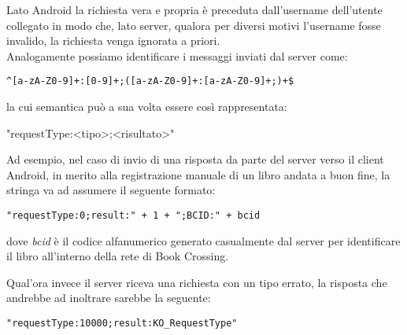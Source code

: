 \noindent Lato Android la richiesta vera e propria è preceduta dall'username dell'utente collegato in modo che, lato server, qualora per diversi motivi l'username fosse invalido, la richiesta venga ignorata a priori.
\\ \noindent
Analogamente possiamo identificare i messaggi inviati dal server come:
\begin{lstlisting}[caption={\textit{RegEx} utilizzata lato server per l'interpretazione delle richieste},captionpos=b]
	^[a-zA-Z0-9]+:[0-9]+;([a-zA-Z0-9]+:[a-zA-Z0-9]+;)+$
\end{lstlisting}
la cui semantica può a sua volta essere così rappresentata:
\begin{center}
	"requestType:<tipo>;<risultato>"
\end{center}

\noindent Ad esempio, nel caso di invio di una risposta da parte del server verso il client Android, in merito alla registrazione manuale di un libro andata a buon fine, la stringa va ad assumere il seguente formato:
\begin{lstlisting}[caption={Risposta OK},captionpos=b]
	"requestType:0;result:" + 1 + ";BCID:" + bcid
\end{lstlisting}

dove \textit{bcid} è il codice alfanumerico generato casualmente dal server per identificare il libro all'interno della rete di Book Crossing.

Qual'ora invece il server riceva una richiesta con un tipo errato, la risposta che andrebbe ad inoltrare sarebbe la seguente:
\begin{lstlisting}[caption={Risposta KO},captionpos=b]
	"requestType:10000;result:KO_RequestType"
\end{lstlisting}






